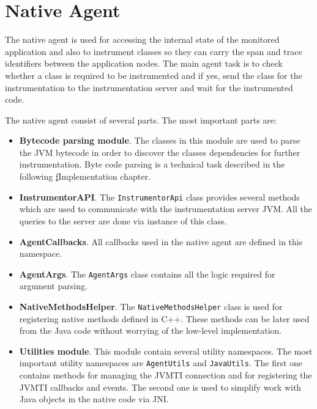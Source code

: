 \section{Native Agent}
\label{native_agent_design}
The native agent is used for accessing the internal state of the monitored application and also to instrument classes so they can carry the span and trace identifiers between the application nodes. The main agent task is to check whether a class is required to be instrumented and if yes, send the class for the instrumentation to the instrumentation server and wait for the instrumented code.

The native agent consist of several parts. The most important parts are:
\begin{itemize}
	\item \textbf{Bytecode parsing module}. \newline The classes in this module are used to parse the JVM bytecode in order to discover the classes dependencies for further instrumentation. Byte code parsing is a technical task described in the following \hyperref[chap:implementation]f{Implementation} chapter.
	\item \textbf{InstrumentorAPI}. \newline The \texttt{InstrumentorApi} class provides several methods which are used to communicate with the instrumentation server JVM. All the queries to the server are done via instance of this class.
	\item \textbf{AgentCallbacks}. \newline All callbacks used in the native agent are defined in this namespace.
	\item \textbf{AgentArgs}.  \newline The \texttt{AgentArgs} class contains all the logic required for argument parsing.
	\item \textbf{NativeMethodsHelper}. \newline The \texttt{NativeMethodsHelper} class is used for registering native methods defined in C++. These methods can be later used from the Java code without worrying of the low-level implementation.
	\item \textbf{Utilities module}. \newline This module contain several utility namespaces. The most important utility namespaces are \texttt{AgentUtils} and \texttt{JavaUtils}. The first one contains methods for managing the JVMTI connection and for registering the JVMTI callbacks and events. The second one is used to simplify work with Java objects in the native code via JNI. 
\end{itemize}

